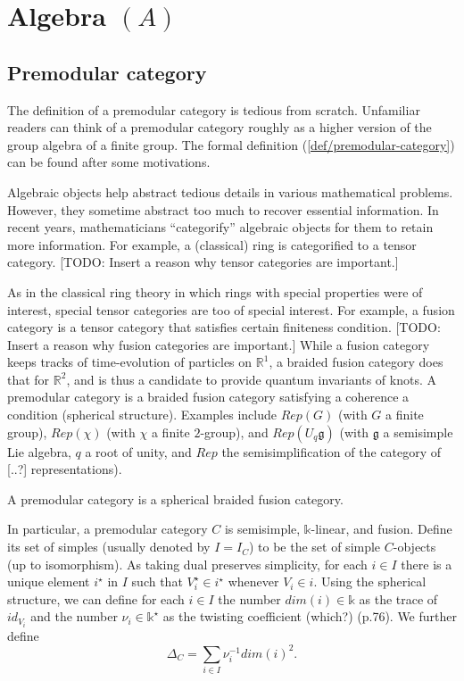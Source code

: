 
\section{Algebra $(A)$}
\subsection{Premodular category}

The definition of a premodular category is tedious from scratch.
Unfamiliar readers can think of a premodular category roughly as
a higher version of the group algebra of a finite group. The
formal definition (\ref{def/premodular-category}) can be found
after some motivations.

Algebraic objects help abstract tedious details in various
mathematical problems. However, they sometime abstract too much
to recover essential information. In recent years, mathematicians
``categorify'' algebraic objects for them to retain more
information. For example, a (classical) ring is categorified to a
tensor category. [TODO: Insert a reason why tensor categories are
important.]

As in the classical ring theory in which rings with special
properties were of interest, special tensor categories are too of
special interest. For example, a fusion category is a tensor
category that satisfies certain finiteness condition. [TODO:
Insert a reason why fusion categories are important.] While a
fusion category keeps tracks of time-evolution of particles on
$\mathbb{R}^{1}$, a braided fusion category does that for
$\mathbb{R}^{2}$, and is thus a candidate to provide quantum
invariants of knots. A premodular category is a braided fusion
category satisfying a coherence a condition (spherical
structure). Examples include $Rep(G)$ (with $G$ a finite group),
$Rep(\chi)$ (with $\chi$ a finite $2$-group), and
$Rep(U_{q}\mathfrak{g})$ (with $\mathfrak{g}$ a semisimple Lie
algebra, $q$ a root of unity, and $Rep$ the semisimplification of
the category of [..?] representations).

\begin{definition}\label{def/premodular-category}
  A premodular category is a spherical braided fusion category.
\end{definition}

\noindent In particular, a premodular category $C$ is semisimple,
$\mathbb{k}$-linear, and fusion. Define its set of simples
(usually denoted by $I = I_{C}$) to be the set of simple
$C$-objects (up to isomorphism). As taking dual preserves
simplicity, for each $i \in I$ there is a unique element
$i^{\star}$ in $I$ such that $V_{i}^{\star} \in i^{\star}$
whenever $V_{i} \in i$. Using the spherical structure, we can
define for each $i \in I$ the number $dim(i) \in \mathbb{k}$ as
the trace of $id_{V_{i}}$ and the number
$\nu_{i} \in \mathbb{k}^{\star}$ as the twisting coefficient
(which?) (p.76). We further define
$$\Delta_{C} = \sum_{i \in I} \nu_{i}^{-1}dim(i)^{2}.$$

